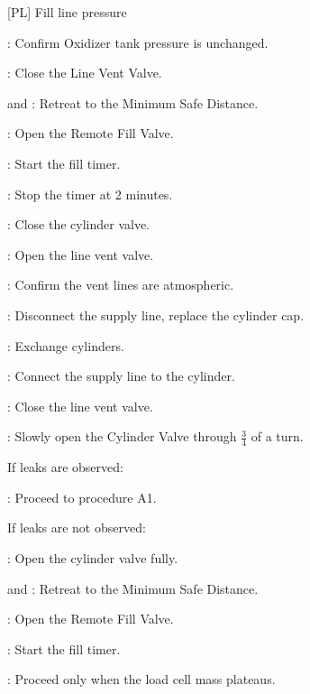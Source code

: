 \begin{checklist}
\begin{checklist}
        \item {[PL]} Fill line pressure
    \end{checklist}
    \item \control{}: Confirm Oxidizer tank pressure is unchanged.
    \item \control{}: Close the Line Vent Valve.
    \item \primary{} and \secondary{}: Retreat to the Minimum Safe Distance.
    \item \control{}: Open the Remote Fill Valve.
    \item \ops{}: Start the fill timer.
    \item \ops{}: Stop the timer at 2 minutes.
    \item \primary{}: Close the cylinder valve.
    \item \control{}: Open the line vent valve.
    \item \control{}: Confirm the vent lines are atmospheric.
    \item \primary{}: Disconnect the supply line, replace the cylinder cap.
    \item \primary{}: Exchange cylinders.
    \item \primary{}: Connect the supply line to the cylinder.
    \item \control{}: Close the line vent valve.
    \item \primary{}: Slowly open the Cylinder Valve through $\frac{3}{4}$ of a turn.
    \begin{checklist}[label=$\bullet$]
        \item If leaks are observed:
        \begin{checklist}
            \item \ops{}: Proceed to procedure A1.
        \end{checklist}
        \item If leaks are not observed:
        \begin{checklist}
            \item \primary{}: Open the cylinder valve fully.
        \end{checklist}
    \end{checklist}
    \item \primary{} and \secondary{}: Retreat to the Minimum Safe Distance.
    \item \control{}: Open the Remote Fill Valve.
    \item \ops{}: Start the fill timer.
    \item \ops{}: Proceed only when the load cell mass plateaus.

\end{checklist}

